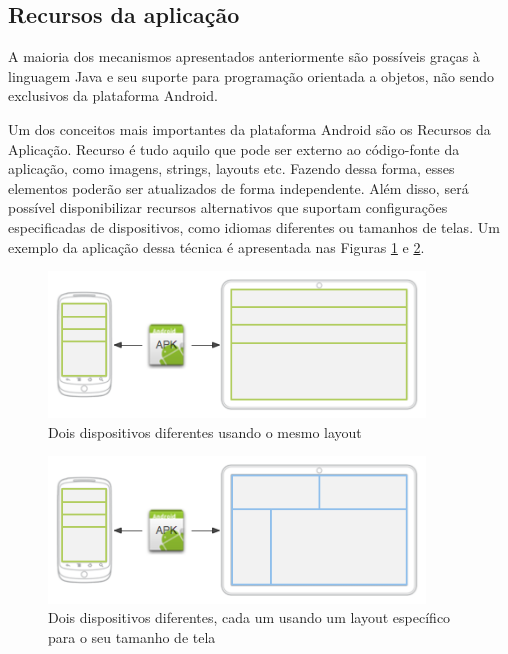 \subsection{Recursos da aplicação}

A maioria dos mecanismos apresentados anteriormente são possíveis graças à linguagem Java
e seu suporte para programação orientada a objetos, não sendo exclusivos da plataforma Android.

Um dos conceitos mais importantes da plataforma Android são os Recursos da Aplicação. 
Recurso é tudo aquilo que pode ser externo ao código-fonte da aplicação, como imagens, 
strings, layouts etc. Fazendo dessa forma, esses elementos poderão ser atualizados de 
forma independente. Além disso, será possível disponibilizar recursos alternativos
que suportam configurações especificadas de dispositivos, como idiomas diferentes 
ou tamanhos de telas. Um exemplo da aplicação dessa técnica é apresentada nas Figuras 
\ref{um_layout} e \ref{dois_layout}.

\begin{figure}[h]
    \centering
    \includegraphics[width=10cm]{img/resource_devices_diagram1}
    \caption{Dois dispositivos diferentes usando o mesmo layout}
    \label{um_layout}
\end{figure}

\begin{figure}[h]
    \centering
    \includegraphics[width=10cm]{img/resource_devices_diagram2}
    \caption{Dois dispositivos diferentes, cada um usando um layout específico para o seu tamanho de tela}
    \label{dois_layout}
\end{figure}


